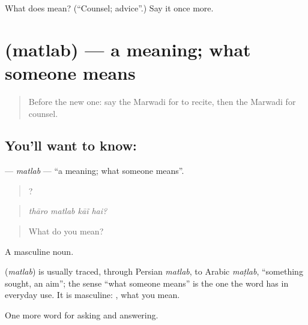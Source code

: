 \begin{tcolorbox}[breakable,colback=teal!4,colframe=teal!35!black,title={Before you move on}]
What does  mean? (\textquotedblleft{}Counsel; advice\textquotedblright{}.) Say it once more.
\end{tcolorbox}
\section[\texorpdfstring{\mw{मतलब} (matlab)}{मतलब (matlab)}]{ (matlab) — a meaning; what someone means}

\label{lesson:MW-C268-matlab}



\begin{quote}
Before the new one: say the Marwadi for to recite, then the Marwadi for counsel.
\end{quote}

\subsection*{You'll want to know: }
\textbf{} — \emph{matlab} — \textquotedblleft{}a meaning; what someone means\textquotedblright{}.

\begin{quote}
   ?
\end{quote}

\begin{quote}
\emph{thāro matlab kāĩ hai?}
\end{quote}

\begin{quote}
What do you mean?
\end{quote}

A masculine noun.

\begin{cousinweb}
\textbf{} (\emph{matlab}) is usually traced, through Persian \emph{matlab}, to Arabic \emph{maṭlab}, \textquotedblleft{}something sought, an aim\textquotedblright{}; the sense \textquotedblleft{}what someone means\textquotedblright{} is the one the word has in everyday use. It is masculine: \textbf{ }, what you mean.
\end{cousinweb}

\begin{grammarlens}[title={What you've built}]
One more word for asking and answering.
\end{grammarlens}

